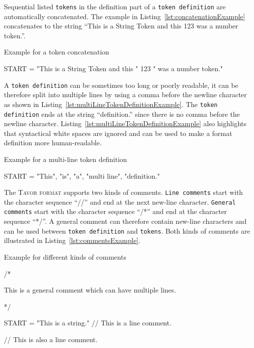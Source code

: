 Sequential listed \texttt{tokens} in the definition part of a \texttt{token definition} are automatically concatenated. The example in Listing~\ref{lst:concatenationExample} concatenates to the string \enquote{This is a String Token and this 123 was a number token.}.

\begin{listing}
\caption{Example for a token concatenation}
\label{lst:concatenationExample}
\begin{gocode}
START = "This is a String Token and this " 123 " was a number token."
\end{gocode}
\end{listing}

A \texttt{token definition} can be sometimes too long or poorly readable, it can be therefore split into multiple lines by using a comma before the newline character as shown in Listing~\ref{lst:multiLineTokenDefinitionExample}. The \texttt{token definition} ends at the string \enquote{definition.} since there is no comma before the newline character. Listing~\ref{lst:multiLineTokenDefinitionExample} also highlights that syntactical white spaces are ignored and can be used to make a format definition more human-readable.

\begin{listing}
\caption{Example for a multi-line token definition}
\label{lst:multiLineTokenDefinitionExample}
\begin{gocode}
START = "This",
        "is",
        "a",
        "multi line",
        "definition."
\end{gocode}
\end{listing}

The \textsc{Tavor format} supports two kinds of comments. \texttt{Line comments} start with the character sequence \enquote{//} and end at the next new-line character. \texttt{General comments} start with the character sequence \enquote{/*} and end at the character sequence \enquote{*/}. A general comment can therefore contain new-line characters and can be used between \texttt{token definition} and \texttt{tokens}. Both kinds of comments are illustrated in Listing~\ref{lst:commentsExample}.

\begin{listing}
\caption{Example for different kinds of comments}
\label{lst:commentsExample}
\begin{gocode}
/*

This is a general comment
which can have
multiple lines.

*/

START = "This is a string." // This is a line comment.

// This is also a line comment.
\end{gocode}
\end{listing}

